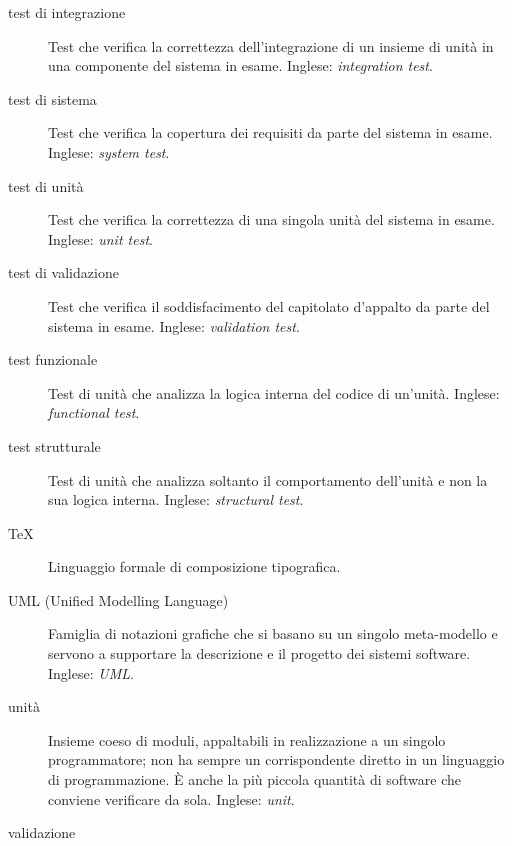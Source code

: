 \documentclass[a4paper]{article}
\begin{document}
\begin{description}
	\item[test di integrazione] 

			Test che verifica la correttezza dell'integrazione di un insieme di unità in una componente del sistema in esame. Inglese: \emph{integration test}.
			
	\item[test di sistema] 

			Test che verifica la copertura dei requisiti da parte del sistema in esame. Inglese: \emph{system test}.
			
	\item[test di unità] 

			Test che verifica la correttezza di una singola unità del sistema in esame. Inglese: \emph{unit test}.
			
	\item[test di validazione] 

			Test che verifica il soddisfacimento del capitolato d'appalto da parte del sistema in esame. Inglese: \emph{validation test}.
			
	\item[test funzionale] 

			Test di unità che analizza la logica interna del codice di un'unità. Inglese: \emph{functional test}.
			
	\item[test strutturale] 

			Test di unità che analizza soltanto il comportamento dell'unità e non la sua logica interna. Inglese: \emph{structural test}.
			
	\item[TeX] 

			Linguaggio formale di composizione tipografica.
			
	\item[UML (Unified Modelling Language)] 

			Famiglia di notazioni grafiche che si basano su un singolo meta-modello e servono a supportare la descrizione e il progetto dei sistemi software. Inglese: \emph{UML}.
			
	\item[unità] 

			Insieme coeso di moduli, appaltabili in realizzazione a un singolo programmatore; non ha sempre un corrispondente diretto in un linguaggio di programmazione. È anche la più piccola quantità di software che conviene verificare da sola. Inglese: \emph{unit}.
			
	\item[validazione] 


\end{description}
\end{document}
